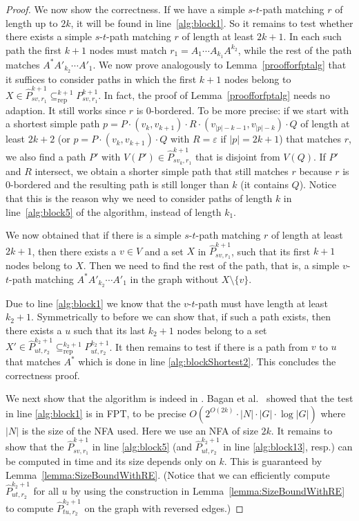 \documentclass[a4paper,english]{lipics-v2016}
\theoremstyle{plain}
\begin{document}
\begin{proof}
 We now show the correctness.
  If we have a simple $s$-$t$-path matching $r$ of length up to $2k$, it will be found in
  line~\ref{alg:block1}.   So it remains to test whether there exists a simple $s$-$t$-path matching $r$ of length at least $2k+1$.
  In each such path the first $k+1$ nodes must match $r_1 = A_1 \cdots A_{k_1} A^{k_2}$, while the rest of the path matches $A^* A'_{k_2} \cdots A'_{1}$. 
  We now prove analogously to Lemma~\ref{proofforfptalg} that it suffices to consider paths in which the first $k+1$ nodes belong to $X \in \hat{P}^{k+1}_{sv,r_1} \subseteq^{k+1}_\text{rep} P^{k+1}_{sv,r_1}$. 
In fact, the proof of Lemma~\ref{proofforfptalg} needs no adaption. It
still works since $r$ is 0-bordered. To be more precise: if we start
with a shortest simple path $p=P \cdot (v_k,v_{k+1}) \cdot  R \cdot  (v_{|p|-k-1},v_{|p|-k}) \cdot  Q$ of length at least $2k+2$ (or $p=P \cdot (v_k,v_{k+1}) \cdot  Q$ with $R = \varepsilon$ if $|p| = 2k+1$) that matches $r$, we also find a path $P'$ with $V(P') \in \hat{P}^{k+1}_{sv_k,r_1}$ that is disjoint from $V(Q)$. If $P'$ and $R$ intersect, we obtain a shorter simple path that still matches $r$ because $r$ is 0-bordered and the resulting path is still longer than $k$ (it contains $Q$). Notice that this is the reason why we need to consider paths of length
$k$ in line~\ref{alg:block5} of the algorithm, instead of length $k_1$.

We now obtained that if there is a simple $s$-$t$-path matching $r$ of length at least $2k+1$, then there exists a $v \in V$ and a set $X$ in $\hat{P}^{k+1}_{sv,r_1}$, such that its first $k+1$ nodes belong to $X$. Then we need to find the rest of the path, that is, a simple $v$-$t$-path matching $A^* A'_{k_2} \cdots A'_1$ in the graph without $X\setminus \{v\}$. 

Due to line \ref{alg:block1} we know that the $v$-$t$-path must have length at least $k_2+1$. Symmetrically to before we can show that, if such a path exists, then there exists a $u$ such that its last $k_2+1$ nodes belong to a set $X' \in \hat{P}^{k_2+1}_{ut,r_2} \subseteq^{k_2+1}_\text{rep} P^{k_2+1}_{ut,r_2}$. It then remains to test if there is a path from $v$ to $u$ that matches $A^*$ which is done in line \ref{alg:blockShortest2}.
This concludes the correctness proof.

We next show that the algorithm is indeed in \fpt.
Bagan et al.~\cite[Theorem 6]{bagan} showed that the test in line \ref{alg:block1} is in FPT, to be precise $O(2^{O(2k)}\cdot|N|\cdot |G| \cdot \log |G|)$ where $|N|$ is the size of the NFA used. Here we use an NFA of size $2k$.
It remains to show that the $\hat{P}^{k+1}_{sv,r_1}$ in line
\ref{alg:block5} (and $\hat{P}^{k_2+1}_{ut,r_2}$ in line
\ref{alg:block13}, resp.) can be computed in \fpt time and its size
depends only on $k$. This is guaranteed by
Lemma~\ref{lemma:SizeBoundWithRE}.                                 (Notice that we can efficiently compute $\hat{P}^{k_2+1}_{ut,r_2}$ for all $u$ by using the construction in Lemma~\ref{lemma:SizeBoundWithRE} to compute $\hat{P}^{k_2+1}_{tu,r_2}$ on the graph with reversed edges.)


\end{proof}
\end{document}

